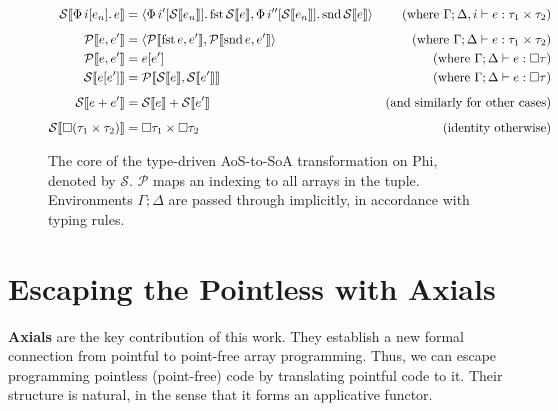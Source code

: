 \begin{figure}
    \centering
    \begin{align*}
\phisoa {\phivec{i}{e_n}{e}}
&= \phipair{\phivec{i'}{\phisoa{e_n}}{\phifst{\phisoa{e}}}}{\phivec{i''}{\phisoa{e_n}}{\phisnd{\phisoa{e}}}}
&\text{(where }\Gamma; \Delta, i \vdash e : \phipairtype{\tau_1}{\tau_2} \text{)} \\[0.5em]
\phitupleindex{e}{e'}
&= \phipair{\phitupleindex{\phifst{e}}{e'}}{\phitupleindex{\phisnd{e}}{e'}}
&\text{(where }\Gamma; \Delta \vdash e : \phipairtype{\tau_1}{\tau_2} \text{)} \\
\phitupleindex{e}{e'}
&= e\left[ e' \right]
&\text{(where }\Gamma; \Delta \vdash e : \phivectype{\tau} \text{)} \\
\phisoa{e[e']}
&= \phitupleindex{\phisoa{e}}{\phisoa{e'}}
&\text{(where }\Gamma; \Delta \vdash e : \phivectype{\tau} \text{)} \\[0.5em]
\phisoa{e + e'}
&= \phisoa{e} + \phisoa{e'}
&\text{(and similarly for other cases)} \\[0.5em]
\phisoa{\phivectype{(\phipairtype{\tau_1}{\tau_2}})} &= \phipairtype{\phivectype{\tau_1}}{\phivectype{\tau_2}} &\text{(identity otherwise)}
    \end{align*}
    \caption{The core of the type-driven AoS-to-SoA transformation on Phi, denoted by $\mathcal S$. $\mathcal P$ maps an indexing to all arrays in the tuple. Environments $\Gamma; \Delta$ are passed through implicitly, in accordance with typing rules.}
    \label{fig:aos-to-soa}
\end{figure}

\section{Escaping the Pointless with Axials}
\label{escaping-the-pointless}

\textbf{Axials} are the key contribution of this work. They establish a new formal connection from pointful to point-free array programming. Thus, we can escape programming pointless (point-free) code by translating pointful code to it. Their structure is natural, in the sense that it forms an applicative functor.


\newcommand{\sizeat}[1]{s_{#1}}
\newcommand{\altsizeat}[1]{S_{#1}}
\newcommand{\denotindex}{\mathrm{Index}}
\newcommand{\denotvalue}{\mathrm{Value}}
\newcommand{\denotvar}{\mathrm{Var}}
\newcommand{\denotenv}{\mathrm{Env}}
\newcommand{\denotenvindex}{\mathrm{IndexEnv}}
\newcommand{\denotenvvar}{\mathrm{VarEnv}}


